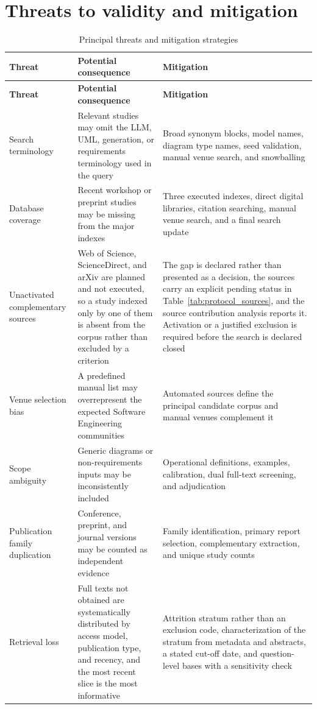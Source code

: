 \section{Threats to validity and mitigation}
\label{sec:protocol_validity}

\begin{longtable}{p{} p{} p{}}
\caption{Principal threats and mitigation strategies}
\label{tab:protocol_threats}\\
\toprule
\textbf{Threat} & \textbf{Potential consequence} & \textbf{Mitigation} \\
\midrule
\endfirsthead
\toprule
\textbf{Threat} & \textbf{Potential consequence} & \textbf{Mitigation} \\
\midrule
\endhead
Search terminology & Relevant studies may omit the LLM, UML, generation, or requirements terminology used in the query & Broad synonym blocks, model names, diagram type names, seed validation, manual venue search, and snowballing \\
Database coverage & Recent workshop or preprint studies may be missing from the major indexes & Three executed indexes, direct digital libraries, citation searching, manual venue search, and a final search update \\
Unactivated complementary sources & Web of Science, ScienceDirect, and arXiv are planned and not executed, so a study indexed only by one of them is absent from the corpus rather than excluded by a criterion & The gap is declared rather than presented as a decision, the sources carry an explicit pending status in Table~\ref{tab:protocol_sources}, and the source contribution analysis reports it. Activation or a justified exclusion is required before the search is declared closed \\
Venue selection bias & A predefined manual list may overrepresent the expected Software Engineering communities & Automated sources define the principal candidate corpus and manual venues complement it \\
Scope ambiguity & Generic diagrams or non-requirements inputs may be inconsistently included & Operational definitions, examples, calibration, dual full-text screening, and adjudication \\
Publication family duplication & Conference, preprint, and journal versions may be counted as independent evidence & Family identification, primary report selection, complementary extraction, and unique study counts \\
Retrieval loss & Full texts not obtained are systematically distributed by access model, publication type, and recency, and the most recent slice is the most informative & Attrition stratum rather than an exclusion code, characterization of the stratum from metadata and abstracts, a stated cut-off date, and question-level bases with a sensitivity check \\

\end{longtable}
